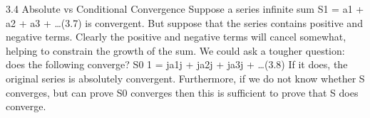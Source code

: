 
3.4 Absolute vs Conditional Convergence
Suppose a series infinite sum
S1 = a1 + a2 + a3 + \ldots (3.7)
is convergent. But suppose that the series contains positive and negative terms. Clearly
the positive and negative terms will cancel somewhat, helping to constrain the growth
of the sum. We could ask a tougher question: does the following converge?
S0
1 = ja1j + ja2j + ja3j + \ldots (3.8)
If it does, the original series is absolutely convergent. Furthermore, if we do not know
whether S converges, but can prove S0 converges then this is sufficient to prove that
S does converge.
